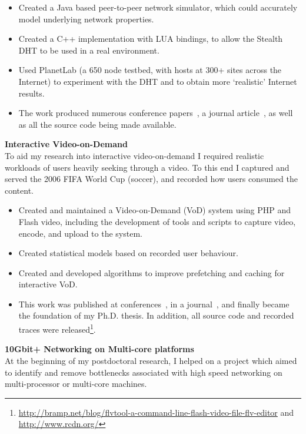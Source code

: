 \documentclass[a4paper,10pt]{article}
\begin{document}
 \begin{itemize}
  \item Created a Java based peer-to-peer network simulator, which could accurately model underlying network properties.
  \item Created a C++ implementation with LUA bindings, to allow the Stealth DHT to be used in a real environment.
  \item Used PlanetLab (a 650 node testbed, with hosts at 300+ sites across the Internet) to experiment with the DHT and to obtain more `realistic' Internet results.
  \item The work produced numerous conference papers~\cite{rai2007pmp, brampton2006sdh, macquire2006asd, macquire2006pas,  brampton2005sdh}, a journal article~\cite{macquire2008asd}, as well as all the source code being made available.
 \end{itemize}
\vspace{1em}

\textbf{Interactive Video-on-Demand}\\
To aid my research into interactive video-on-demand I required realistic workloads of users heavily seeking through a video. To this end I captured and served the 2006 FIFA World Cup (soccer), and recorded how users consumed the content.

\begin{itemize}
 \item Created and maintained a Video-on-Demand (VoD) system using PHP and Flash video, including the development of tools and scripts to capture video, encode, and upload to the system.
 \item Created statistical models based on recorded user behaviour.
 \item Created and developed algorithms to improve prefetching and caching for interactive VoD.
 \item This work was published at conferences~\cite{brampton2007cui,macquire2008acf}, in a journal~\cite{brampton2008cew}, and finally became the foundation of my Ph.D. thesis. In addition, all source code and recorded traces were released\footnote{\href{http://bramp.net/blog/flvtool-a-command-line-flash-video-file-flv-editor}{http://bramp.net/blog/flvtool-a-command-line-flash-video-file-flv-editor} and \href{http://www.rcdn.org/}{http://www.rcdn.org/}}.
\end{itemize}
\vspace{1em}

\textbf{10Gbit+ Networking on Multi-core platforms}\\
 At the beginning of my postdoctoral research, I helped on a project which aimed to identify and remove bottlenecks associated with high speed networking on multi-processor or multi-core machines.
\end{document}
